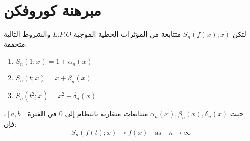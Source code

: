 	\newpage
	\section{مبرهنة كوروفكن }
	لتكن \( S_n(f(x); x) \) متتابعة من المؤثرات الخطية الموجبة \( L.P.O \) والشروط التالية متحققة:
\begin{english}
		\begin{enumerate}
		\item \( S_n(1; x) = 1 + \alpha_n(x) \)
		\item \( S_n(t; x) = x + \beta_n(x) \)
		\item \( S_n(t^2; x) = x^2 + \delta_n(x) \)
	\end{enumerate}
\end{english}
	حيث \( \alpha_n(x), \beta_n(x), \delta_n(x) \) متتابعات متقاربة بانتظام إلى 0 في الفترة \([a, b]\)، فإن:
	\[
	S_n(f(t); x) \to f(x) \quad \text{as} \quad n \to \infty
	\]
	